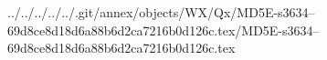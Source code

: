 ../../../../../.git/annex/objects/WX/Qx/MD5E-s3634--69d8ce8d18d6a88b6d2ca7216b0d126c.tex/MD5E-s3634--69d8ce8d18d6a88b6d2ca7216b0d126c.tex